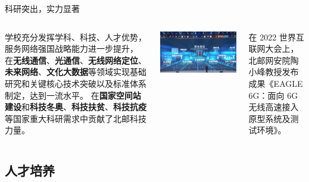\documentclass[aspectratio=169, utf8]{beamer}
\begin{document}
\begin{frame}{科研突出，实力显著}
    \begin{columns}
        \setlength{\parindent}{2em}

        学校充分发挥学科、科技、人才优势，服务网络强国战略能力进一步提升，
        在\textcolor{Fore}{\textbf{无线通信}}、\textcolor{Fore}{\textbf{光通信}}、\textcolor{Fore}{\textbf{无线网络定位}}、
        \textcolor{Fore}{\textbf{未来网络}}、\textcolor{Fore}{\textbf{文化大数据}}等领域实现基础研究和关键核心技术突破以及标准体系制定，达到一流水平。
        在\textcolor{Fore}{\textbf{国家空间站建设}}和\textcolor{Fore}{\textbf{科技冬奥}}、\textcolor{Fore}{\textbf{科技扶贫}}、\textcolor{Fore}{\textbf{科技抗疫}}等国家重大科研需求中贡献了北邮科技力量。

        \includegraphics[width=\textwidth]{./resources/9.png}
        \setlength{\parindent}{2em}
        \scriptsize

        在 2022 世界互联网大会上，北邮网安院陶小峰教授发布成果《EAGLE 6G：面向 6G 无线高速接入原型系统及测试环境》。
    \end{columns}
\end{frame}

\subsection*{人才培养}
\end{document}
